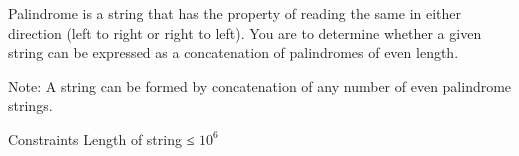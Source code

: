 Palindrome is a string that has the property of reading the same in either direction (left to right or right to left). You are to determine whether a given string can be expressed as a concatenation of palindromes of even length.  

   Note: A string can be formed by concatenation of any number of even palindrome strings.  

Constraints
Length of string ≤ $10^{6}$